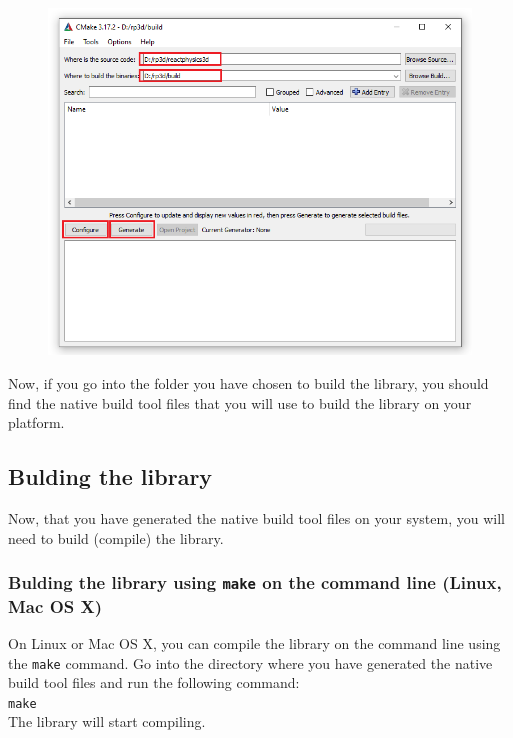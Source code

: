 \documentclass[a4paper,12pt]{article}
\begin{document}
    \begin{figure}[!ht]
        \centering
	\includegraphics[scale=0.6]{CMakeWin.png}
        \label{fig:cmakewin}
    \end{figure}

     Now, if you go into the folder you have chosen to build the library, you should find the native build tool files that you will use to build
     the library on your platform.

     \subsection{Bulding the library}

     Now, that you have generated the native build tool files on your system, you will need to build (compile) the library.

     \subsubsection{Bulding the library using \texttt{make} on the command line (Linux, Mac OS X)}

     On Linux or Mac OS X, you can compile the library on the command line using the \texttt{make} command. Go into the directory where you have generated the
     native build tool files and run the following command: \\

     \texttt{make} \\

     The library will start compiling. 
\end{document}
